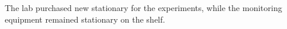 The lab purchased new stationary for the experiments, while the monitoring equipment remained stationary on the shelf.
